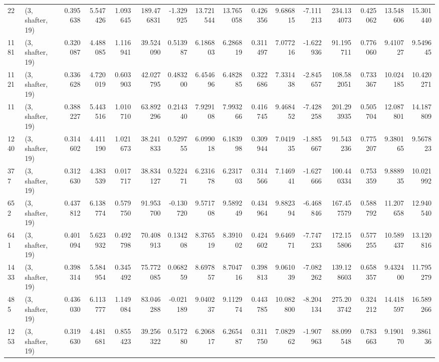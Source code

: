 \begin{tabular}{llrrrrrrrrrrrrrr}
22   &  (3, shafter, 19) &   0.395638 &   5.547426 &   1.093645 &    189.476831 &   -1.329925 &   13.721544 &   13.765058 &  0.426356 &   9.686815 &  -7.111213 &   234.134073 &   0.425062 &  13.548606 &  15.301440 \\
1181 &  (3, shafter, 19) &   0.320087 &   4.488085 &   1.116941 &     39.524090 &    0.513987 &    6.186803 &    6.286819 &  0.311497 &   7.077216 &  -1.622936 &    91.195711 &   0.776060 &   9.410727 &   9.549645 \\
1121 &  (3, shafter, 19) &   0.336628 &   4.720019 &   0.603903 &     42.027795 &    0.483200 &    6.454696 &    6.482885 &  0.322686 &   7.331438 &  -2.845657 &   108.582051 &   0.733367 &  10.024185 &  10.420271 \\
11   &  (3, shafter, 19) &   0.388227 &   5.443516 &   1.010710 &     63.892296 &    0.214340 &    7.929108 &    7.993266 &  0.416745 &   9.468452 &  -7.428258 &   201.293935 &   0.505704 &  12.087801 &  14.187809 \\
1240 &  (3, shafter, 19) &   0.314602 &   4.411190 &   1.021673 &     38.241833 &    0.529755 &    6.099018 &    6.183998 &  0.309944 &   7.041935 &  -1.885667 &    91.543236 &   0.775207 &   9.380165 &   9.567823 \\
377  &  (3, shafter, 19) &   0.312630 &   4.383539 &   0.017717 &     38.834127 &    0.522471 &    6.231678 &    6.231703 &  0.314566 &   7.146941 &  -1.627666 &   100.440334 &   0.753359 &   9.888935 &  10.021992 \\
652  &  (3, shafter, 19) &   0.437812 &   6.138774 &   0.579750 &     91.953700 &   -0.130720 &    9.571708 &    9.589249 &  0.434964 &   9.882394 &  -6.468846 &   167.457579 &   0.588792 &  11.207658 &  12.940540 \\
641  &  (3, shafter, 19) &   0.401094 &   5.623932 &   0.492798 &     70.408913 &    0.134208 &    8.376519 &    8.391002 &  0.424602 &   9.646971 &  -7.747233 &   172.155806 &   0.577255 &  10.589437 &  13.120816 \\
1433 &  (3, shafter, 19) &   0.398314 &   5.584954 &   0.345492 &     75.772085 &    0.068259 &    8.697857 &    8.704716 &  0.398813 &   9.061039 &  -7.082262 &   139.128603 &   0.658357 &   9.432400 &  11.795279 \\
485  &  (3, shafter, 19) &   0.436030 &   6.113777 &   1.149084 &     83.046288 &   -0.021189 &    9.040237 &    9.112974 &  0.443785 &  10.082800 &  -8.204134 &   275.203742 &   0.324212 &  14.418597 &  16.589266 \\
1253 &  (3, shafter, 19) &   0.319630 &   4.481681 &   0.855423 &     39.256322 &    0.517280 &    6.206817 &    6.265487 &  0.311750 &   7.082962 &  -1.907963 &    88.099548 &   0.783663 &   9.190170 &   9.386136 \\

\end{tabular}
